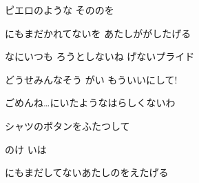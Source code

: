 \documentclass[14pt]{ltjsarticle}
\begin{document}
{  ピエロのような そののを
  \jisho{}

  にもまだかれてないを あたしががしたげる
  \jisho{}

\item
  なにいつも ろうとしないね げないプライド
  \jisho{}

  どうせみんなそう がい もういいにして!
  \jisho{}

\item
  ごめんね…にいたようなはらしくないわ
  \jisho{}

  シャツのボタンをふたつして
  \jisho{}

  のけ いは
  \jisho{}

  にもまだしてないあたしのをえたげる
  \jisho{}

  
}
\end{document}
